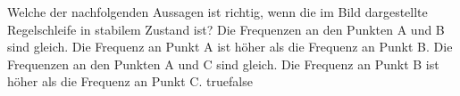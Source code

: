     {Welche der nachfolgenden Aussagen ist richtig, wenn die im Bild dargestellte Regelschleife in stabilem Zustand ist?}
    {Die Frequenzen an den Punkten A und B sind gleich.}
    {Die Frequenz an Punkt A ist höher als die Frequenz an Punkt B.}
    {Die Frequenzen an den Punkten A und C sind gleich.}
    {Die Frequenz an Punkt B ist höher als die Frequenz an Punkt C.}
    {true}{false}